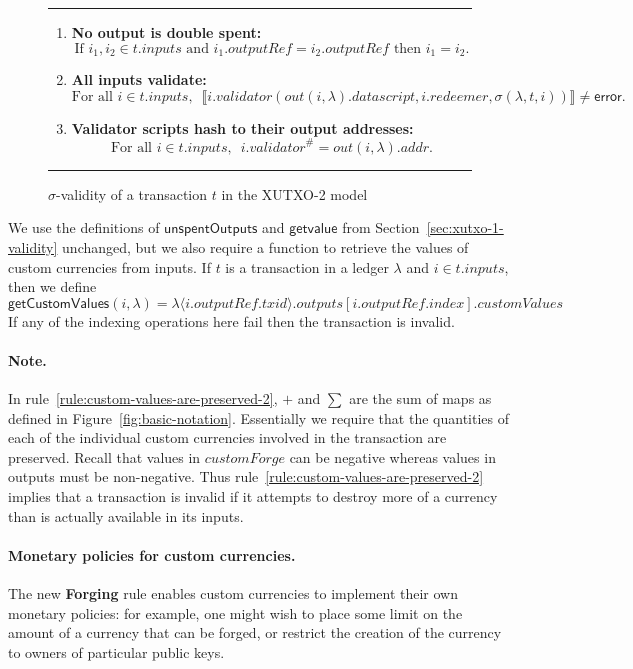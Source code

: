 \documentclass[a4paper]{article}
\newcommand{\s}{\textsf}  %
\theoremstyle{definition}  %
\newcommand\rfskip{7pt}
\newenvironment{ruledfigure}[1]{\begin{figure}[#1]\hrule\vspace{\rfskip}}{\vspace{\rfskip}\hrule\end{figure}}
\newcommand{\mi}[1]{\ensuremath{\mathit{#1}}}
\newcommand{\txid}{\mi{txid}}
\newcommand{\idx}{\mi{index}}
\newcommand{\inputs}{\mi{inputs}}
\newcommand{\outputs}{\mi{outputs}}
\newcommand{\addr}{\mi{addr}}
\newcommand{\customvals}{\mi{customValues}}
\newcommand{\customforge}{\mi{customForge}}
\newcommand{\validator}{\mi{validator}}
\newcommand{\redeemer}{\mi{redeemer}}
\newcommand{\datascript}{\mi{datascript}}
\newcommand{\outputref}{\mi{outputRef}}
\newcommand{\txout}{\mi{out}}
\newcommand{\getvalue}{\msf{getvalue}}
\newcommand{\msf}[1]{\ensuremath{\mathsf{#1}}}
\newcommand{\unspent}{\msf{unspentOutputs}}
\begin{document}
\begin{ruledfigure}{H}
\begin{enumerate}
\begin{minipage}{0.85\textwidth}
          \end{minipage}
    \item \label{rule:no-double-spending-2} \textbf{No output is double spent:}
    \[
     \textrm{If } i_1, i_2 \in t.\inputs \textrm{ and }  i_1.\mathit{outputRef} = i_2.\mathit{outputRef}
     \textrm{ then } i_1 = i_2.
    \]
    \item\label{rule:all-inputs-validate-2} \textbf{All inputs validate:}
    \[
    \textrm{For all } i \in t.\inputs,\enspace \llbracket
    i.\validator(\txout(i,
    \lambda).\datascript,i.\redeemer, \sigma(\lambda, t, i))
    \rrbracket \ne \textsf{error}.
      \]
    \item\label{rule:validator-scripts-hash-2} \textbf{Validator scripts hash to their output addresses:}
    \[
      \textrm{For all } i \in t.\inputs,\enspace i.\validator^{\#} = \txout(i, \lambda).\addr.
    \]
  \end{enumerate}
  \caption{$\sigma$-validity of a transaction $t$ in the XUTXO-2 model}
  \label{fig:xutxo-2-validity}

\end{ruledfigure}

We use the definitions of \unspent{}  and
\getvalue{} from Section~\ref{sec:xutxo-1-validity} unchanged,
but we also require a function to retrieve the values of
custom currencies from inputs. If $t$ is a transaction in a ledger
$\lambda$ and $i \in t.\inputs$, then we define 
$$
\s{getCustomValues}(i,\lambda) = \lambda\langle i.\outputref.\txid \rangle.\outputs[i.\outputref.\idx].\customvals
$$
\noindent If any of the indexing operations here fail then the
transaction is invalid.

\paragraph{Note.} In rule~\ref{rule:custom-values-are-preserved-2}, $+$ and $\sum$ are the
sum of maps as defined in Figure~\ref{fig:basic-notation}. Essentially
we require that the quantities of each of the individual custom currencies
involved in the transaction are preserved.  Recall that values in
$\customforge$ can be negative whereas values in outputs must
be non-negative.  Thus rule~\ref{rule:custom-values-are-preserved-2} implies
that a transaction is invalid if it attempts to destroy more of a currency
than is actually available in its inputs.


\paragraph{Monetary policies for custom currencies.}
The new \textbf{Forging}
rule enables custom currencies to implement their own monetary
policies: for example, one might wish to place some limit on the
amount of a currency that can be forged, or restrict the creation of
the currency to owners of particular public keys.
\end{document}
